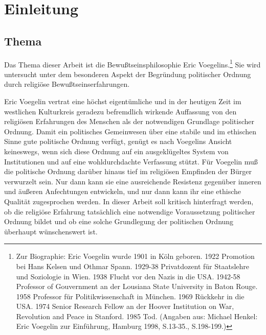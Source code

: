 

\chapter{Einleitung}


\section{Thema}

Das Thema dieser Arbeit ist die Bewußtseinsphilosophie Eric
Voegelins.\footnote{Zur Biographie: Eric Voegelin wurde 1901 in Köln geboren.
  1922 Promotion bei Hans Kelsen und Othmar Spann. 1929-38 Privatdozent für
  Staatslehre und Soziologie in Wien. 1938 Flucht vor den Nazis in die USA.
  1942-58 Professor of Gouvernment an der Lousiana State University in Baton
  Rouge.  1958 Professor für Politikwissenschaft in München. 1969 Rückkehr in
  die USA.  1974 Senior Research Fellow an der Hoover Institution on War,
  Revolution and Peace in Stanford. 1985 Tod. (Angaben aus: Michael Henkel:
  Eric Voegelin zur Einführung, Hamburg 1998, S.13-35., S.198-199.)} Sie wird
untersucht unter dem besonderen Aspekt der Begründung politischer Ordnung
durch religiöse Bewußtseinserfahrungen.

Eric Voegelin vertrat eine höchst eigentümliche und in der heutigen Zeit im
westlichen Kulturkreis geradezu befremdlich wirkende Auf\/fassung von den
religiösen Erfahrungen des Menschen als der notwendigen Grundlage politischer
Ordnung. Damit ein politisches Gemeinwesen über eine stabile und im ethischen
Sinne gute politische Ordnung verfügt, genügt es nach Voegelins Ansicht
keineswegs, wenn sich diese Ordnung auf ein ausgeklügeltes System von
Institutionen und auf eine wohldurchdachte Verfassung stützt. Für Voegelin muß
die politische Ordnung darüber hinaus tief im religiösen Empfinden der Bürger
verwurzelt sein. Nur dann kann sie eine ausreichende Resistenz gegenüber
inneren und äußeren Anfechtungen entwickeln, und nur dann kann ihr eine
ethische Qualität zugesprochen werden. In dieser Arbeit soll kritisch
hinterfragt werden, ob die religiöse Erfahrung tatsächlich eine notwendige
Voraussetzung politischer Ordnung bildet und ob eine solche Grundlegung der
politischen Ordnung überhaupt wünschenswert ist.

